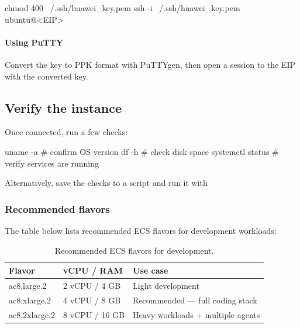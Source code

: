 \documentclass[english]{guide}
\begin{document}
\begin{codigo}[bash]
chmod 400 ~/.ssh/huawei_key.pem
ssh -i ~/.ssh/huawei_key.pem ubuntu@<EIP>
\end{codigo}

\paragraph{Using PuTTY}
Convert the key to PPK format with PuTTYgen, then open a session to the
EIP with the converted key.

\subsection{Verify the instance}

Once connected, run a few checks:

\begin{codigo}[bash]
uname -a          # confirm OS version
df -h             # check disk space
systemctl status  # verify services are running
\end{codigo}

Alternatively, save the checks to a script and run it with

\subsubsection{Recommended flavors}

The table below lists recommended ECS flavors for development workloads:

\begin{table}[h]
  \centering
  \small
  \begin{tabular}{lll}
    \toprule
    \textbf{Flavor} & \textbf{vCPU / RAM} & \textbf{Use case} \\
    \midrule
    ac8.large.2  & 2 vCPU / 4 GB  & Light development \\
    ac8.xlarge.2 & 4 vCPU / 8 GB  & Recommended --- full coding stack \\
    ac8.2xlarge.2 & 8 vCPU / 16 GB & Heavy workloads + multiple agents \\
    \bottomrule
  \end{tabular}
  \caption{Recommended ECS flavors for development.}
\end{table}


\end{document}

